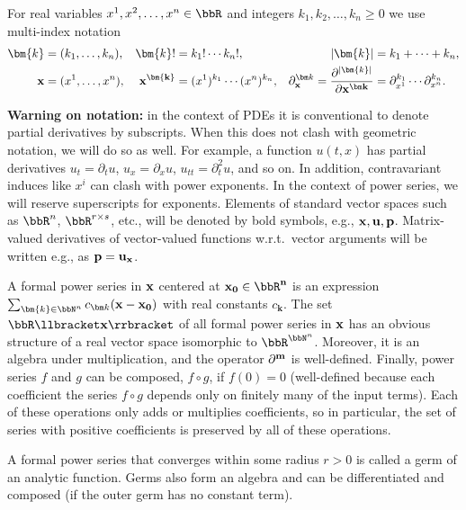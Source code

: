 For real variables $x^1,x^2,\ldots,x^n\in\bbR$ and integers $k_1,k_2,\ldots,k_n\geq 0$ we use multi-index notation 
\begin{align}
    \bm{k}&=(k_1,\ldots,k_n), &\bm{k}!&=k_1!\cdots k_n!,&  |\bm{k}|&=k_1+\cdots+k_n,\\
    \bf{x}&=(x^1,\ldots,x^n), &\bf{x}^{\bm{k}}&=(x^1)^{k_1}\cdots (x^n)^{k_n},& \partial^{\bm k}_{\bf x}=\frac{\partial^{|\bm{k}|}}{\partial\bf{x}^{\bm k}}&=\partial^{k_1}_{x^1}\cdots \partial^{k_n}_{x^n}.
\end{align}

\textbf{Warning on notation:} in the context of PDEs it is conventional to denote partial derivatives by subscripts. When this does not clash with geometric notation, we will do so as well. For example, a function $u(t,x)$ has partial derivatives $u_t=\partial_t u$, $u_{x}=\partial_x u$, $u_{tt}=\partial_t^2 u$, and so on. In addition, contravariant induces like $x^i$ can clash with power exponents. In the context of power series, we will reserve superscripts for exponents. Elements of standard vector spaces such as $\bbR^n$, $\bbR^{r\times s}$, etc., will be denoted by bold symbols, e.g., $\bf{x},\bf{u},\bf{p}$. Matrix-valued derivatives of vector-valued functions w.r.t.\ vector arguments will be written e.g., as $\bf{p}=\bf{u}_{\bf{x}}$.

\begin{defn}
    A formal power series in $\bf{x}$ centered at $\bf{x}_0\in\bbR^n$ is an expression $\sum_{\bm{k}\in\bbN^n}c_{\bm k}(\bf{x}-\bf{x}_0)$ with real constants $c_{\bm k}$. The set $\bbR\llbracket\bf{x}\rrbracket$ of all formal power series in $\bf{x}$ has an obvious structure of a real vector space isomorphic to $\bbR^{\bbN^n}$. Moreover, it is an algebra under multiplication, and the operator $\partial^{\bf{m}}$ is well-defined. Finally, power series $f$ and $g$ can be composed, $f\circ g$, if $f(0)=0$ (well-defined because each coefficient the series $f\circ g$ depends only on finitely many of the input terms). Each of these operations only adds or multiplies coefficients, so in particular, the set of series with positive coefficients is preserved by all of these operations.
\end{defn}

\begin{defn}
    A formal power series that converges within some radius $r>0$ is called a germ of an analytic function. Germs also form an algebra and can be differentiated and composed (if the outer germ has no constant term).
\end{defn}

